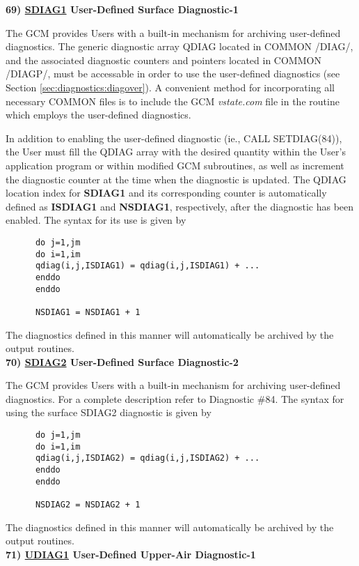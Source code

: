 \noindent
{\bf 69)  \underline {SDIAG1} User-Defined Surface Diagnostic-1 }

\noindent
The GCM provides Users with a built-in mechanism for archiving user-defined
diagnostics.  The generic diagnostic array QDIAG located in COMMON /DIAG/, and the associated 
diagnostic counters and pointers located in COMMON /DIAGP/,
must be accessable in order to use the user-defined diagnostics (see Section \ref{sec:diagnostics:diagover}).  
A convenient method for incorporating all necessary COMMON files is to
include the GCM {\em vstate.com} file in the routine which employs the
user-defined diagnostics.

\noindent
In addition to enabling the user-defined diagnostic (ie., CALL SETDIAG(84)), the User must fill 
the QDIAG array with the desired quantity within the User's
application program or within modified GCM subroutines, as well as increment
the diagnostic counter at the time when the diagnostic is updated.  
The QDIAG location index for {\bf SDIAG1} and its corresponding counter is 
automatically defined as {\bf ISDIAG1} and {\bf NSDIAG1}, respectively, after the 
diagnostic has been enabled.  
The syntax for its use is given by
\begin{verbatim}
      do j=1,jm
      do i=1,im
      qdiag(i,j,ISDIAG1) = qdiag(i,j,ISDIAG1) + ...
      enddo
      enddo

      NSDIAG1 = NSDIAG1 + 1
\end{verbatim}
The diagnostics defined in this manner will automatically be archived by the output routines.
\\

\noindent
{\bf 70)  \underline {SDIAG2} User-Defined Surface Diagnostic-2 }

\noindent
The GCM provides Users with a built-in mechanism for archiving user-defined
diagnostics.  For a complete description refer to Diagnostic \#84.
The syntax for using the surface SDIAG2 diagnostic is given by
\begin{verbatim}
      do j=1,jm
      do i=1,im
      qdiag(i,j,ISDIAG2) = qdiag(i,j,ISDIAG2) + ...
      enddo
      enddo

      NSDIAG2 = NSDIAG2 + 1
\end{verbatim}
The diagnostics defined in this manner will automatically be archived by the output routines.
\\

\noindent
{\bf 71)  \underline {UDIAG1} User-Defined Upper-Air Diagnostic-1 }

